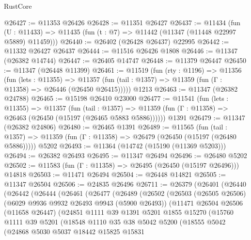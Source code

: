 \begin{lexlean}{RustCore}
\begin{coremodule}
@26427 := @11353 @26426
@26428 := @11351 @26427
@26437 := @11434
    (fun (U : @11433) => @11435 (fun (t : @7) => @11442 (@11347 (@11448 @22997 @5889) @11459)))
@26440 := @26402 (@26428 @26437) @22995
@26442 := @11332 @26427 @26437
@26444 := @11516 @26426 @1808
@26446 := @11347 (@26382 @14744)
@26447 := @26405 @14747
@26448 := @11379 @26447
@26450 := @11347 (@26448 @11399)
@26461 := @11519
    (fun (rty : @1196) =>
    @11356
      (fun (lets : @11355) =>
      @11357 (fun (tail : @1357) => @11359 (fun (Γ : @11358) => @26446 (@26450 @26415)))))
    @1213
@26463 := @11347 (@26382 @24788)
@26465 := @15198 @26410 @23000
@26477 := @11541
    (fun (lets : @11355) =>
    @11357
      (fun (tail : @1357) =>
      @11359 (fun (Γ : @11358) => @26463 (@26450 (@15197 (@26465 @5883 @5886))))))
    @1391
@26479 := @11347 (@26382 @24806)
@26480 := @26465 @1391
@26489 := @11565
    (fun (tail : @1357) => @11359 (fun (Γ : @11358) => @26479 (@26450 (@15197 (@26480 @5886)))))
    @5202
@26493 := @11364 (@14742 (@15190 (@11369 @5203)))
@26494 := @26382 @26493
@26495 := @11347 @26494
@26496 := @26480 @5202
@26502 := @11583 (fun (Γ : @11358) => @26495 (@26450 (@15197 @26496))) @14818
@26503 := @11471 @26494
@26504 := @26448 @14821
@26505 := @11347 @26504
@26506 := @24835 @26496
@26711 := @26379
    (@26401
      (@26440
        (@26442
          (@26444
            (@26461
              (@26477
                (@26489
                  (@26502
                    (@26503
                      (@26505 @26506)
                      (@6029 @9936 @9932 @26493 @9943 (@5900 @26493))
                      (@11471
                        @26504
                        @26506
                        (@11658 @26447)
                        (@24851
                          @1111
                          @39
                          @1391
                          @5201
                          @1855
                          @15270
                          (@15760
                            @1111
                            @39
                            @5201
                            (@18548
                              @1110
                              @35
                              @38
                              @5042
                              @5200
                              (@18555
                                @5042
                                (@24868
                                  @5030
                                  @5037
                                  @18442
                                  @15825
                                  @15831

\end{coremodule}
\end{lexlean}
